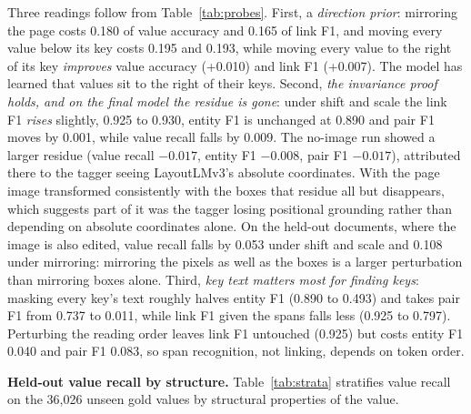 \documentclass[11pt,a4paper]{article}
\begin{document}
Three readings follow from Table~\ref{tab:probes}. First, a \emph{direction prior}: mirroring the
page costs 0.180 of value accuracy and 0.165 of link F1, and moving every value below its key
costs 0.195 and 0.193, while moving every value to the right of its key \emph{improves} value
accuracy (+0.010) and link F1 (+0.007). The model has learned that values sit to the right of
their keys. Second, \emph{the invariance proof holds, and on the final model the residue is gone}:
under shift and scale the link F1 \emph{rises} slightly, 0.925 to 0.930, entity F1 is unchanged at
0.890 and pair F1 moves by 0.001, while value recall falls by 0.009. The no-image run showed a
larger residue (value recall $-0.017$, entity F1 $-0.008$, pair F1 $-0.017$), attributed there to
the tagger seeing LayoutLMv3's absolute coordinates. With the page image transformed consistently
with the boxes that residue all but disappears, which suggests part of it was the tagger losing
positional grounding rather than depending on absolute coordinates alone. On the held-out
documents, where the image is also edited, value recall falls by 0.053 under shift and scale and
0.108 under mirroring: mirroring the pixels as well as the boxes is a larger perturbation than
mirroring boxes alone. Third, \emph{key text matters most for finding keys}: masking every key's
text roughly halves entity F1 (0.890 to 0.493) and takes pair F1 from 0.737 to 0.011, while link
F1 given the spans falls less (0.925 to 0.797). Perturbing the reading order leaves link F1
untouched (0.925) but costs entity F1 0.040 and pair F1 0.083, so span recognition, not linking,
depends on token order.

\textbf{Held-out value recall by structure.} Table~\ref{tab:strata} stratifies value recall on
the 36{,}026 unseen gold values by structural properties of the value.
\end{document}
